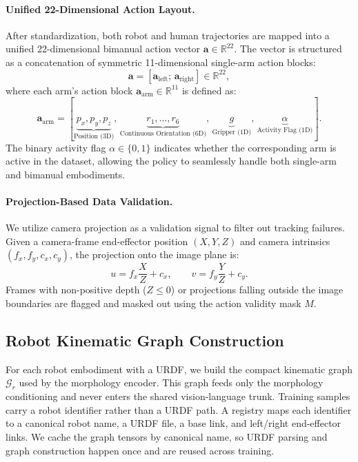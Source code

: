 \documentclass{llmxive}
\begin{document}
\paragraph{Unified 22-Dimensional Action Layout.}
After standardization, both robot and human trajectories are mapped into a unified 22-dimensional bimanual action vector $\mathbf{a} \in \mathbb{R}^{22}$. The vector is structured as a concatenation of symmetric 11-dimensional single-arm action blocks:
\begin{equation}
\mathbf{a} = \left[ \mathbf{a}_{\mathrm{left}};\, \mathbf{a}_{\mathrm{right}} \right] \in \mathbb{R}^{22},
\end{equation}
where each arm's action block $\mathbf{a}_{\mathrm{arm}} \in \mathbb{R}^{11}$ is defined as:
\begin{equation}
\mathbf{a}_{\mathrm{arm}} = \left[ \underbrace{p_x, p_y, p_z}_{\text{Position (3D)}}, \, \underbrace{r_1, \dots, r_6}_{\text{Continuous Orientation (6D)}}, \, \underbrace{g}_{\text{Gripper (1D)}}, \, \underbrace{\alpha}_{\text{Activity Flag (1D)}} \right].
\end{equation}
The binary activity flag $\alpha \in \{0, 1\}$ indicates whether the corresponding arm is active in the dataset, allowing the policy to seamlessly handle both single-arm and bimanual embodiments.

\paragraph{Projection-Based Data Validation.}
We utilize camera projection as a validation signal to filter out tracking failures. Given a camera-frame end-effector position $(X,Y,Z)$ and camera intrinsics $(f_x,f_y,c_x,c_y)$, the projection onto the image plane is:
\begin{equation}
    u = f_x \frac{X}{Z} + c_x,
    \qquad
    v = f_y \frac{Y}{Z} + c_y.
\end{equation}
Frames with non-positive depth ($Z \le 0$) or projections falling outside the image boundaries are flagged and masked out using the action validity mask $M$.

\subsection{Robot Kinematic Graph Construction}
\label{app:urdf-graph-construction}

For each robot embodiment with a URDF, we build the compact kinematic graph $\mathcal{G}_{r}$ used by the morphology encoder. This graph feeds only the morphology conditioning and never enters the shared vision-language trunk. Training samples carry a robot identifier rather than a URDF path. A registry maps each identifier to a canonical robot name, a URDF file, a base link, and left/right end-effector links. We cache the graph tensors by canonical name, so URDF parsing and graph construction happen once and are reused across training.
\end{document}

